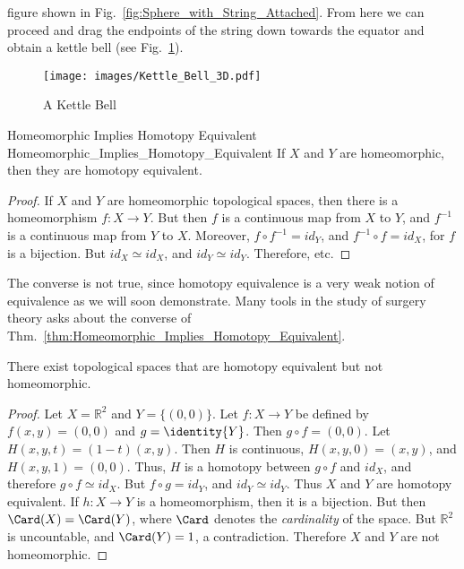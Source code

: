 \documentclass{article}                                                        %
\begin{document}
        figure shown in Fig.~\ref{fig:Sphere_with_String_Attached}. From here we
        can proceed and drag the endpoints of the string down towards the
        equator and obtain a kettle bell (see Fig.~\ref{fig:Kettle_Bell}).
        \begin{figure}[H]
            \centering
            \captionsetup{type=figure}
            \texttt{[image: images/Kettle\_Bell\_3D.pdf]}
            \caption{A Kettle Bell}
            \label{fig:Kettle_Bell}
        \end{figure}
        \begin{ltheorem}{Homeomorphic Implies Homotopy Equivalent}
                        {Homeomorphic_Implies_Homotopy_Equivalent}
            If $X$ and $Y$ are homeomorphic, then they are homotopy equivalent.
        \end{ltheorem}
        \begin{proof}
            If $X$ and $Y$ are homeomorphic topological spaces, then there
            is a homeomorphism $f:X\rightarrow Y$. But then $f$ is a
            continuous map from $X$ to $Y$, and $f^{-1}$ is a continuous
            map from $Y$ to $X$. Moreover, ${f}\circ{f^{-1}}=id_{Y}$, and
            ${f^{-1}}\circ{f}=id_{X}$, for $f$ is a bijection. But
            ${id_{X}}\simeq{id_{X}}$, and ${id_{Y}}\simeq{id_{Y}}$.
            Therefore, etc.
        \end{proof}
        The converse is not true, since homotopy equivalence is a very weak
        notion of equivalence as we will soon demonstrate. Many tools in the
        study of surgery theory asks about the converse of
        Thm.~\ref{thm:Homeomorphic_Implies_Homotopy_Equivalent}.
        \begin{theorem}
            \label{thm:homotopic_does_not_imply_homeomorphic}%
            There exist topological spaces that are homotopy equivalent but not
            homeomorphic.
        \end{theorem}
        \begin{proof}
            Let $X=\mathbb{R}^{2}$ and $Y=\{(0,0)\}$. Let $f:{X}\rightarrow{Y}$
            be defined by $f(x,y)=(0,0)$ and $g=\identity{Y}$. Then
            $g\circ{f}=(0,0)$. Let $H(x,y,t)=(1-t)(x,y)$.
            Then $H$ is continuous, $H(x,y,0)=(x,y)$,
            and $H(x,y,1)=(0,0)$. Thus, $H$ is a
            homotopy between ${g}\circ{f}$ and $id_{X}$, and
            therefore ${g}\circ{f}\simeq{id_{X}}$. But
            ${f}\circ{g}=id_{Y}$, and ${id_{Y}}\simeq{id_{Y}}$.
            Thus $X$ and $Y$ are homotopy equivalent.
            If $h:{X}\rightarrow{Y}$ is a homeomorphism, then it is a
            bijection. But then $\Card(X)=\Card(Y)$,
            where $\Card$ denotes the \textit{cardinality} of the space.
            But $\mathbb{R}^{2}$ is uncountable, and $\Card(Y)=1$,
            a contradiction. Therefore $X$ and $Y$ are not homeomorphic.
        \end{proof}
\end{document}

